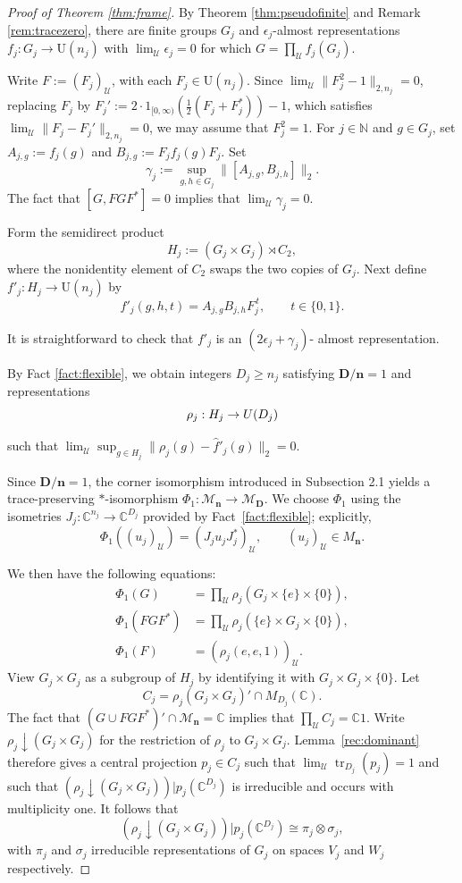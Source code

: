 \documentclass[12pt]{amsart}
\numberwithin{equation}{section}
\theoremstyle{definition}
\newcommand{\C}{\mathbb{C}}
\newcommand{\N}{\mathbb{N}}
\def\bb{\mathbb}
\def\cal{\mathcal}
\def\M{\mathcal{M}}
\DeclareMathOperator{\tr}{tr}
\newcommand\cU{{\cal U}}
\def \M{\mathcal{M}}
\begin{document}
\begin{proof}[Proof of Theorem \ref{thm:frame}]
By Theorem \ref{thm:pseudofinite} and Remark \ref{rem:tracezero}, there are finite groups $G_j$
and $\epsilon_j$-almost representations $f_j:G_j\to\mathrm U(n_j)$ with $\lim_\cU \epsilon_j=0$ for which $G=\prod_\cU f_j(G_j)$.

Write $F:=(F_j)_\cU$, with each $F_j\in \mathrm{U}(n_j)$. Since $\lim_{\mathcal{U}}\|F_j^2-1\|_{2,n_j}=0$, replacing $F_j$ by $F_j':=2\cdot 1_{[0,\infty)}(\frac{1}{2}(F_j+F_j^*))-1$, which satisfies $\lim_{\cU}\|F_j-F_j'\|_{2,n_j}=0$, we may assume that  $F_j^2=1$.  For $j\in \N$ and $g\in G_j$, set $A_{j,g}:=f_j(g)$ and $B_{j,g}:=F_jf_j(g)F_j$.
Set
\[
 \gamma_j:=\sup_{g,h\in G_j}
       \|[A_{j,g},B_{j,h}]\|_2.
\]
The fact that $[G,FGF^*]=0$ implies that $\lim_\cU \gamma_j=0$.  

Form the semidirect product
\[
 H_j:=(G_j\times G_j)\rtimes C_2,
\]
where the nonidentity element of $C_2$ swaps the two copies of $G_j$.
Next define $f'_j:H_j\to \mathrm{U}(n_j)$ by
\[
 f'_j(g,h,t)=A_{j,g}B_{j,h}F_j^{\,t},
 \qquad t\in\{0,1\}.
\]

It is straightforward to check that $f'_j$ is an $(2\epsilon_j+\gamma_j)$-
almost representation. 

By Fact \ref{fact:flexible}, we obtain integers $D_j\geq n_j$ satisfying $\mathbf{D}/\mathbf{n}=1$ and representations
\[
 \rho_j:H_j\to\mathrm \mathrm{U}(D_j)
\]

such that $\lim_\cU \sup_{g\in H_j}\|\rho_j(g)-\hat f'_j(g)\|_2=0$.

Since $\mathbf D/\mathbf n=1$, the corner
isomorphism introduced in Subsection 2.1
yields a trace-preserving $*$-isomorphism
$\Phi_1:\M_{\mathbf n}\to\M_{\mathbf D}$. We choose $\Phi_1$ using the isometries
$J_j:\C^{n_j}\to\C^{D_j}$ provided by
Fact~\ref{fact:flexible}; explicitly, 
\[\Phi_1((u_j)_{\cU})=(J_ju_jJ_j^*)_{\cU},\qquad (u_j)_{\cU}\in M_{\mathbf{n}}.\]

We then have the following equations:
\begin{align*}
 \Phi_1(G)&=\prod_\cU \rho_j(G_j\times\{e\}\times \{0\}),\\
 \Phi_1(FGF^*)&=\prod_\cU \rho_j(\{e\}\times G_j\times \{0\}),\\
 \Phi_1(F)&=(\rho_j(e,e,1))_\cU.
\end{align*}
View $G_j\times G_j$ as a subgroup of $H_j$ by identifying it with $G_j\times G_j\times \{0\}$.  
Let
\[
 C_j=\rho_j(G_j\times G_j)'
          \cap M_{D_j}(\C).
\]
The fact that $(G\cup FGF^*)'\cap \M_{\mathbf{n}}=\bb C$ implies that
$\prod_{\cU}C_j=\C1$.  Write $\rho_j\downarrow (G_j\times G_j)$ for the restriction of $\rho_j$ to $G_j\times G_j$.  Lemma~\ref{rec:dominant}
therefore gives a central projection $p_j\in C_j$ such that $\lim_\cU \tr_{D_j}(p_j)=1$ and such that $(\rho_j\downarrow (G_j\times G_j))|p_j(\bb C^{D_j})$ is irreducible and occurs with multiplicity one.  It follows that $$(\rho_j\downarrow (G_j\times G_j))|p_j(\bb C^{D_j})\cong \pi_j\otimes\sigma_j,$$
with $\pi_j$ and $\sigma_j$ irreducible representations
of $G_j$ on spaces $V_j$ and $W_j$ respectively.


\end{proof}
\end{document}
